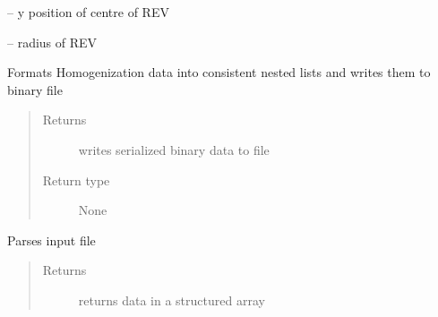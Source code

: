 \documentclass[letterpaper,10pt,english]{sphinxmanual}
\begin{document}
\begin{fulllineitems}
\begin{fulllineitems}
\end{fulllineitems}


\begin{fulllineitems}
\label{\detokenize{MouseReferenceManual:Modules.Module_HODS.Module_HODS.revCentreY}}
 -- y position of centre of REV

\end{fulllineitems}


\begin{fulllineitems}
\label{\detokenize{MouseReferenceManual:Modules.Module_HODS.Module_HODS.revRadius}}
 -- radius of REV

\end{fulllineitems}


\begin{fulllineitems}
\label{\detokenize{MouseReferenceManual:Modules.Module_HODS.Module_HODS.formatOutput}}
Formats Homogenization data into consistent nested lists and writes them to binary file
\begin{quote}\begin{description}
\item[{Returns}] \leavevmode
writes serialized binary data to file

\item[{Return type}] \leavevmode
None

\end{description}\end{quote}

\end{fulllineitems}


\begin{fulllineitems}
\label{\detokenize{MouseReferenceManual:Modules.Module_HODS.Module_HODS.parseInput}}
Parses input file
\begin{quote}\begin{description}
\item[{Returns}] \leavevmode
returns data in a structured array


\end{description}
\end{quote}
\end{fulllineitems}
\end{fulllineitems}
\end{document}
